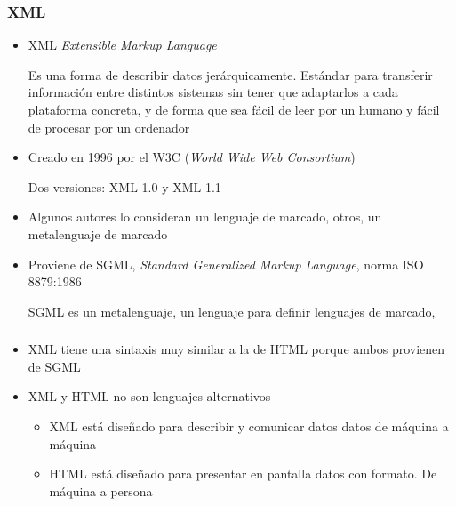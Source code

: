 \documentclass[ucs]{beamer}
\begin{document}
\begin{frame}[fragile]
\frametitle{XML}
\begin{itemize}
\item
XML \emph{Extensible Markup Language}

Es una forma de describir datos jerárquicamente.
Estándar para transferir información entre distintos sistemas sin tener
que adaptarlos a cada plataforma concreta, y de forma que sea fácil
de leer por un humano y fácil de procesar por un ordenador

\item
Creado en 1996 por el W3C (\emph{World Wide Web Consortium})

Dos versiones: XML 1.0 y XML 1.1
\item
Algunos autores lo consideran un lenguaje de marcado, otros, un metalenguaje
de marcado
\item
Proviene de
SGML, \emph{Standard Generalized Markup Language}, norma ISO 8879:1986


SGML es un metalenguaje, un lenguaje para definir lenguajes de marcado,
\end{itemize}
\end{frame}




\begin{frame}[fragile]
\frametitle{}
\begin{itemize}
\item
XML tiene una sintaxis muy similar a la de HTML porque ambos provienen de SGML
\item
XML y HTML no son lenguajes alternativos

\begin{itemize}
\item
XML está diseñado para describir y comunicar datos datos de máquina a máquina
\item
HTML está diseñado para presentar en pantalla datos con formato. De máquina a persona 
\end{itemize}

\end{itemize}

\end{frame}
\end{document}
